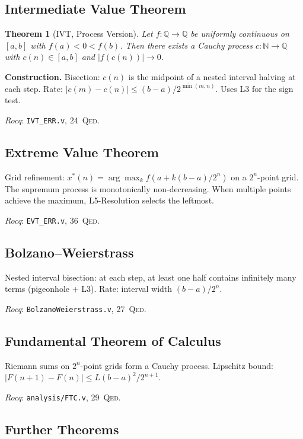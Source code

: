 \documentclass[11pt,a4paper]{article}
\newtheorem{theorem}{Theorem}[section]
\theoremstyle{definition}
\theoremstyle{remark}
\newcommand{\natQ}{\mathbb{N} \to \mathbb{Q}}
\newcommand{\Qed}{\textsc{Qed}}
\begin{document}
\subsection{Intermediate Value Theorem}

\begin{theorem}[IVT, Process Version]
Let $f : \mathbb{Q} \to \mathbb{Q}$ be uniformly continuous on $[a, b]$ with $f(a) < 0 < f(b)$.  Then there exists a Cauchy process $c : \natQ$ with $c(n) \in [a, b]$ and $|f(c(n))| \to 0$.
\end{theorem}

\textbf{Construction.}  Bisection: $c(n)$ is the midpoint of a nested interval halving at each step.  Rate: $|c(m) - c(n)| \le (b-a)/2^{\min(m,n)}$.  Uses L3 for the sign test.

\emph{Rocq}: \texttt{IVT\_ERR.v}, 24~\Qed.

\subsection{Extreme Value Theorem}

Grid refinement: $x^*(n) = \arg\max_k f(a + k(b{-}a)/2^n)$ on a $2^n$-point grid.  The supremum process is monotonically non-decreasing.  When multiple points achieve the maximum, L5-Resolution selects the leftmost.

\emph{Rocq}: \texttt{EVT\_ERR.v}, 36~\Qed.

\subsection{Bolzano--Weierstrass}

Nested interval bisection: at each step, at least one half contains infinitely many terms (pigeonhole + L3).  Rate: interval width $(b{-}a)/2^n$.

\emph{Rocq}: \texttt{BolzanoWeierstrass.v}, 27~\Qed.

\subsection{Fundamental Theorem of Calculus}

Riemann sums on $2^n$-point grids form a Cauchy process.  Lipschitz bound: $|F(n{+}1) - F(n)| \le L(b{-}a)^2/2^{n+1}$.

\emph{Rocq}: \texttt{analysis/FTC.v}, 29~\Qed.

\subsection{Further Theorems}
\end{document}
